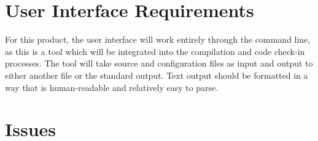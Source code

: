 \documentclass[11pt]{scrreprt}
\begin{document}
\section{User Interface Requirements}

For this product, the user interface will work entirely through the command line, as this is a tool which will be integrated into the compilation and code check-in processes. The tool will take source and configuration files as input and output to either another file or the standard output. Text output should be formatted in a way that is human-readable and relatively easy to parse.

\section{Issues} \label{issues}
\end{document}
